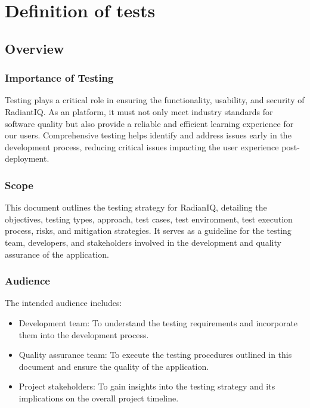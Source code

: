 \section{Definition of tests} \label{definition_of_tests}

	\subsection{Overview}

		\subsubsection{Importance of Testing}

		Testing plays a critical role in ensuring the functionality, usability, and security of RadiantIQ. As an platform, it must not only meet industry standards for software quality but also provide a reliable and efficient learning experience for our users. Comprehensive testing helps identify and address issues early in the development process, reducing critical issues impacting the user experience post-deployment.

		\subsubsection{Scope}

		This document outlines the testing strategy for RadianIQ, detailing the objectives, testing types, approach, test cases, test environment, test execution process, risks, and mitigation strategies. It serves as a guideline for the testing team, developers, and stakeholders involved in the development and quality assurance of the application.

		\subsubsection{Audience}
		
		The intended audience includes:
		
		\begin{itemize}
			\item Development team: To understand the testing requirements and incorporate them into the development process.
			\item Quality assurance team: To execute the testing procedures outlined in this document and ensure the quality of the application.
			\item Project stakeholders: To gain insights into the testing strategy and its implications on the overall project timeline.
		\end{itemize}
		
